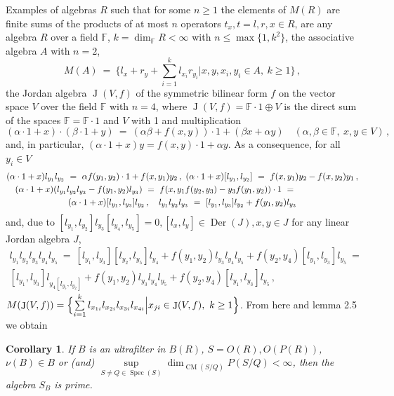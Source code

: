 \documentclass[a4paper,11pt]{article}
\newtheorem{co}[defi]{Corollary}
\DeclareMathOperator{\Spec}{Spec}
\DeclareMathOperator{\Der}{Der}
\DeclareMathOperator{\CM}{CM}
\DeclareMathOperator{\Jr}{J}
\begin{document}
Examples of algebras $R$ such that for some ${n\geq 1}$ the elements of 
$M(R)$ are finite sums of the products of at most $n$ operators 
${t_x, t=l, r, x\in R}$, are any algebra $R$ over a field 
$\mathbb{F}$, ${k=\dim_{\mathbb{F}} R< \infty}$ with ${n\leq \max\{1, k^2\}}$,  
the associative algebra $A$ with ${n=2}$, 
\[
M(A)\ =\ \biggl\{l_x+r_y+\sum_{i=1}^k l_{x_i} r_{y_i}\biggl| 
x, y, x_i, y_i\in A,\ k\geq 1\biggr\}\,,
\]
the Jordan algebra ${\Jr(V, f)}$ of the symmetric bilinear form $f$ on the 
vector space $V$ over the field $\mathbb{F}$ with ${n=4}$, where 
${\Jr(V, f)=\mathbb{F}\cdot 1\oplus V}$ is the direct sum of the spaces 
${\mathbb{F}=\mathbb{F}\cdot 1}$ and $V$ with 1 and multiplication 
\[
(\alpha\cdot 1+x)\cdot (\beta\cdot 1+y)\ =\ (\alpha \beta+f(x, y))\cdot 1+
(\beta x+\alpha y)\quad (\alpha, \beta\in \mathbb{F},\ x, y\in V)\,,
\]
and, in particular, ${(\alpha\cdot 1+x) y=f(x, y)\cdot 1+\alpha y}$. As a 
consequence, for all ${y_i\in V}$
\begin{multline*}
(\alpha\cdot 1+x) l_{y_1} l_{y_2}\ =\ \alpha f(y_1, y_2)\cdot 1+f(x, y_1) y_2\,,
\ 
(\alpha\cdot 1+x) [l_{y_1}, l_{y_2}]\ =\ f(x, y_1) y_2-f(x, y_2) y_1\,,
\\
\shoveleft{
(\alpha\cdot 1+x) (l_{y_1} l_{y_2} l_{y_3}-f(y_1, y_2) l_{y_3})\ =\ 
f(x, y_1 f(y_2, y_3)-y_3 f(y_1, y_2))\cdot 1\ =}
\\
(\alpha\cdot 1+x) [l_{y_1}, l_{y_3}] l_{y_2}\,,\quad  
l_{y_1} l_{y_2} l_{y_3}\ =\ [l_{y_1}, l_{y_3}] l_{y_2}+f(y_1, y_2) l_{y_3} 
\end{multline*}
and, due to ${[l_{y_1}, l_{y_2}] l_{y_3} [l_{y_4}, l_{y_5}]=0,
[l_x, l_y]\in \Der(J), x, y\in J}$ for any linear Jordan algebra $J$,
\begin{multline*}
l_{y_1} l_{y_2} l_{y_3} l_{y_4} l_{y_5}\ =\ 
[l_{y_1}, l_{y_3}] [l_{y_2}, l_{y_5}] l_{y_4}+
f(y_1, y_2) l_{y_3} l_{y_4} l_{y_5}+
f(y_2, y_4) [l_{y_1}, l_{y_3}] l_{y_5}\ =
\\
[l_{y_1}, l_{y_3}] l_{y_4 [l_{y_5}, l_{y_2}]}+
f(y_1, y_2) l_{y_3} l_{y_4} l_{y_5}+
f(y_2, y_4) [l_{y_1}, l_{y_3}] l_{y_5}\,,
\end{multline*}
${M(\Jr(V, f))=\Bigl\{\sum\limits_{i=1}^k 
l_{x_{1 i}} l_{x_{2 i}} l_{x_{3 i}} l_{x_{4 i}}\Bigl| x_{j i}\in 
\Jr(V, f),\ k\geq 1\Bigr\}}$. From here and lemma 2.5 we obtain 

\begin{co}
If $B$ is an ultrafilter in $B(R)$, ${S=O(R), O(P(R))}$, ${\nu(B)\in B}$ or 
(and) ${\sup\limits_{S\ne Q\in \Spec(S)} \dim_{\CM(S/Q)} P(S/Q)< \infty}$, 
then the algebra $S_B$ is prime.
\end{co}
\end{document}
